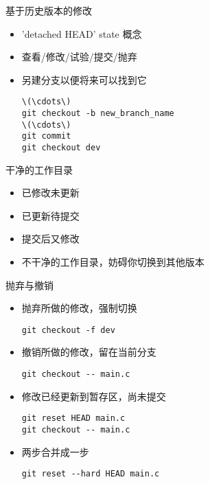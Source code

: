 \begin{frame}[<+->][fragile]{基于历史版本的修改}
    \begin{itemize}
        \item 'detached HEAD' state 概念
        \item 查看/修改/试验/提交/抛弃
        \item 另建分支以便将来可以找到它
\begin{Verbatim}[frame=single,commandchars=\\\{\}]
\(\cdots\)
git checkout -b new_branch_name
\(\cdots\)
git commit
git checkout dev
\end{Verbatim}
    \end{itemize}
\end{frame}

\begin{frame}[<+->][fragile]{干净的工作目录}
    \begin{itemize}
        \item 已修改未更新
        \item 已更新待提交
        \item 提交后又修改
        \item 不干净的工作目录，妨碍你切换到其他版本
    \end{itemize}
\end{frame}

\begin{frame}[<+->][fragile]{抛弃与撤销}
    \begin{itemize}
        \item 抛弃所做的修改，强制切换
        \begin{Verbatim}[frame=single,commandchars=\\\{\}]
git checkout -f dev
        \end{Verbatim}
        \item 撤销所做的修改，留在当前分支
        \begin{Verbatim}[frame=single,commandchars=\\\{\}]
git checkout -- main.c
        \end{Verbatim}
        \item 修改已经更新到暂存区，尚未提交
        \begin{Verbatim}[frame=single,commandchars=\\\{\}]
git reset HEAD main.c
git checkout -- main.c
        \end{Verbatim}
        \item 两步合并成一步
        \begin{Verbatim}[frame=single,commandchars=\\\{\}]
git reset --hard HEAD main.c
        \end{Verbatim}
    \end{itemize}
\end{frame}

